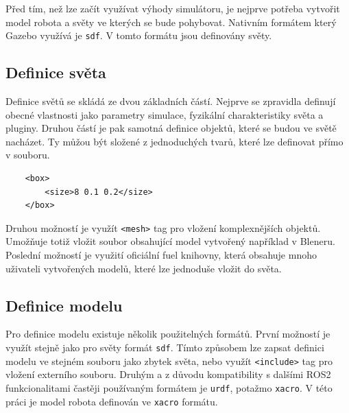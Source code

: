 Před tím, než lze začít využívat výhody simulátoru, je nejprve potřeba vytvořit model robota a světy ve kterých se bude pohybovat. Nativním formátem který Gazebo využívá je \verb|sdf|. V tomto formátu jsou definovány světy.

\subsection*{Definice světa}
Definice světů se skládá ze dvou základních částí. Nejprve se zpravidla definují obecné vlastnosti jako parametry simulace, fyzikální charakteristiky světa a pluginy. Druhou částí je pak samotná definice objektů, které se budou ve světě nacházet. Ty můžou být složené z jednoduchých tvarů, které lze definovat přímo v souboru.
\begin{verbatim}
	<box>
		<size>8 0.1 0.2</size>
	</box>
\end{verbatim}
 Druhou možností je využít \verb|<mesh>| tag pro vložení komplexnějších objektů. Umožňuje totiž vložit soubor obsahující model vytvořený například v Bleneru. Poslední možností je využití oficiální fuel knihovny, která obsahuje mnoho uživateli vytvořených modelů, které lze jednoduše vložit do světa.

\subsection*{Definice modelu}
Pro definice modelu existuje několik použitelných formátů. První možností je využít stejně jako pro světy formát \verb|sdf|. Tímto způsobem lze zapsat definici modelu ve stejném souboru jako zbytek světa, nebo využít \verb|<include>| tag pro vložení externího souboru. Druhým a z důvodu kompatibility s dalšími ROS2 funkcionalitami častěji používaným formátem je \verb|urdf|, potažmo \verb|xacro|. V této práci je model robota definován ve \verb|xacro| formátu. 

